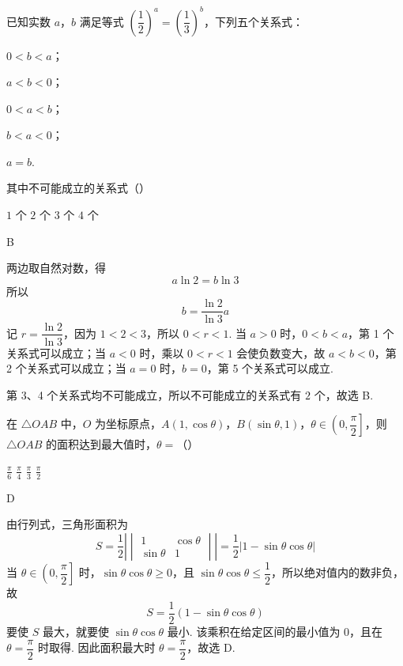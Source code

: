 \begin{problem}
已知实数 \(a\)，\(b\) 满足等式 \(\left(\dfrac12\right)^a=\left(\dfrac13\right)^b\)，下列五个关系式：

\begin{circlelist}
\item \(0<b<a\)；
\item \(a<b<0\)；
\item \(0<a<b\)；
\item \(b<a<0\)；
\item \(a=b\).
\end{circlelist}

其中不可能成立的关系式（\quad）

\choices
    {\(1\) 个}
    {\(2\) 个}
    {\(3\) 个}
    {\(4\) 个}
\end{problem}

\begin{answer}
B
\end{answer}

\begin{solution}
两边取自然对数，得
\[
a\ln2=b\ln3
\]
所以
\[
b=\frac{\ln2}{\ln3}a
\]
记 \(r=\dfrac{\ln2}{\ln3}\)，因为 \(1<2<3\)，所以 \(0<r<1\). 当 \(a>0\) 时，\(0<b<a\)，第 1 个关系式可以成立；当 \(a<0\) 时，乘以 \(0<r<1\) 会使负数变大，故 \(a<b<0\)，第 2 个关系式可以成立；当 \(a=0\) 时，\(b=0\)，第 5 个关系式可以成立.

第 3、4 个关系式均不可能成立，所以不可能成立的关系式有 \(2\) 个，故选 B.
\end{solution}

\begin{problem}
在 \(\triangle OAB\) 中，\(O\) 为坐标原点，\(A(1,\cos\theta)\)，\(B(\sin\theta,1)\)，\(\theta\in\left(0,\dfrac\pi2\right]\)，则 \(\triangle OAB\) 的面积达到最大值时，\(\theta=\)（\quad）

\choices
    {\(\frac\pi6\)}
    {\(\frac\pi4\)}
    {\(\frac\pi3\)}
    {\(\frac\pi2\)}
\end{problem}

\begin{answer}
D
\end{answer}

\begin{solution}
由行列式，三角形面积为
\[
S=\frac12\left|\begin{vmatrix}1&\cos\theta\\ \sin\theta&1\end{vmatrix}\right|
=\frac12|1-\sin\theta\cos\theta|
\]
当 \(\theta\in\left(0,\dfrac\pi2\right]\) 时，\(\sin\theta\cos\theta\geqslant0\)，且 \(\sin\theta\cos\theta\leqslant\dfrac12\)，所以绝对值内的数非负，故
\[
S=\frac12\left(1-\sin\theta\cos\theta\right)
\]
要使 \(S\) 最大，就要使 \(\sin\theta\cos\theta\) 最小. 该乘积在给定区间的最小值为 \(0\)，且在 \(\theta=\dfrac\pi2\) 时取得. 因此面积最大时 \(\theta=\dfrac\pi2\)，故选 D.
\end{solution}

